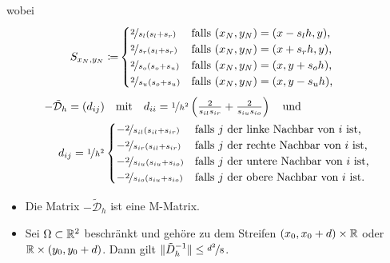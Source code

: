 \documentclass{cheat-sheet}
\newcommand{\DO}{\mathcal{D}} %
\begin{document}
\begin{verf}
  wobei\vspace{-0.3cm}
  \begin{align*}
    S_{x_N,y_N} \coloneqq & \begin{cases}
      \nicefrac{2}{s_l (s_l + s_r)} & \text{falls $(x_N, y_N) = (x - s_l h, y)$,} \\
      \nicefrac{2}{s_r (s_l + s_r)} & \text{falls $(x_N, y_N) = (x + s_r h, y)$,} \\
      \nicefrac{2}{s_o (s_o + s_u)} & \text{falls $(x_N, y_N) = (x, y + s_o h)$,} \\
      \nicefrac{2}{s_u (s_o + s_u)} & \text{falls $(x_N, y_N) = (x, y - s_u h)$,} \\
    \end{cases}
  \end{align*}
  \begin{align*}
    - \tilde{\DO}_h = (d_{ij}) & \quad \text{mit} \quad
    d_{ii} = \nicefrac{1}{h^2} \left( \tfrac{2}{s_{il} s_{ir}} + \tfrac{2}{s_{iu} s_{io}} \right) \quad \text{und} \\
    d_{ij} = \nicefrac{1}{h^2} & \begin{cases}
      - \nicefrac{2}{s_{il} (s_{il} + s_{ir})} & \text{falls $j$ der linke Nachbar von $i$ ist,} \\
      - \nicefrac{2}{s_{ir} (s_{il} + s_{ir})} & \text{falls $j$ der rechte Nachbar von $i$ ist,} \\
      - \nicefrac{2}{s_{iu} (s_{iu} + s_{io})} & \text{falls $j$ der untere Nachbar von $i$ ist,} \\
      - \nicefrac{2}{s_{io} (s_{iu} + s_{io})} & \text{falls $j$ der obere Nachbar von $i$ ist.} \\
    \end{cases}
  \end{align*}
\end{verf}

\begin{lem}
  \begin{itemize}
    \item Die Matrix $- \tilde{\DO}_h$ ist eine M-Matrix.
    \item Sei $\Omega \subset \mathbb{R}^2$ beschränkt und gehöre zu dem Streifen $(x_0, x_0 + d) \times \mathbb{R}$ oder $\mathbb{R} \times (y_0, y_0 + d)$.
    Dann gilt $\lVert\tilde{D}_h^{-1}\rVert \leq \nicefrac{d^2}{8}$.
  \end{itemize}
\end{lem}

\end{document}

